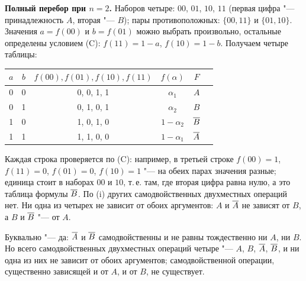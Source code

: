 \begin{solution}[1 (\S\,3)]
\textbf{Полный перебор при $n=2$.} Наборов четыре: $00$, $01$, $10$, $11$
(первая цифра "--- принадлежность $A$, вторая "--- $B$); пары
противоположных: $\{00,11\}$ и $\{01,10\}$. Значения $a=f(00)$ и $b=f(01)$
можно выбрать произвольно, остальные определены условием (C):
$f(11)=1-a$, $f(10)=1-b$. Получаем четыре таблицы:
\begin{center}\small
\begin{tabular}{@{}cccccl@{}}
\toprule
$a$ & $b$ & $f(00),f(01),f(10),f(11)$ & $f(\alpha)$ & $F$\\ \midrule
0&0& 0, 0, 1, 1 & $\alpha_1$ & $A$\\
0&1& 0, 1, 0, 1 & $\alpha_2$ & $B$\\
1&0& 1, 0, 1, 0 & $1-\alpha_2$ & $\overline{B}$\\
1&1& 1, 1, 0, 0 & $1-\alpha_1$ & $\overline{A}$\\
\bottomrule
\end{tabular}
\end{center}
Каждая строка проверяется по (C): например, в третьей строке $f(00)=1$,
$f(11)=0$, $f(01)=0$, $f(10)=1$ "--- на обеих парах значения разные;
единица стоит в наборах $00$ и $10$, т.\,е. там, где вторая цифра равна
нулю, а это таблица формулы $\overline{B}$. По (i) других самодвойственных
двухместных операций нет. Ни одна из четырех не зависит от обоих
аргументов: $A$ и $\overline{A}$ не зависят от $B$, а $B$ и $\overline{B}$ "--- от $A$.

\answer Буквально "--- да: $\overline{A}$ и $\overline{B}$ самодвойственны и не равны
тождественно ни $A$, ни $B$. Но всего самодвойственных двухместных
операций четыре "--- $A$, $B$, $\overline{A}$, $\overline{B}$, и ни одна из них не зависит
от обоих аргументов; самодвойственной операции, существенно зависящей
и от $A$, и от $B$, не существует.
\end{solution}

